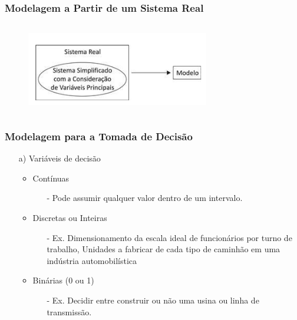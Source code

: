 \documentclass{beamer}
\begin{document}
\begin{frame}
	\frametitle{Modelagem a Partir de um Sistema Real}
	\centering
	\begin{figure}
		\includegraphics[width=8cm,height=4cm]{Figura_1_3.png}
	\end{figure}
\end{frame}

\begin{frame}
	\frametitle{Modelagem para a Tomada de Decisão}
	\begin{itemize}
	\item[a)] {Variáveis de decisão}
		\begin{itemize}
		\item {Contínuas}
			\begin{itemize}
			\item[-] Pode assumir qualquer valor dentro de um intervalo.  
			\end{itemize}
		\item {Discretas ou Inteiras}
			\begin{itemize}
			\item[-] Ex. Dimensionamento da escala ideal de funcionários por turno de trabalho, Unidades a fabricar de cada tipo de caminhão em uma indústria automobilística 
			\end{itemize}
		\item {Binárias (0 ou 1)}
			\begin{itemize}
			\item[-] Ex. Decidir entre construir ou não uma usina ou linha de transmissão. 
			\end{itemize}		
		\end{itemize}
	\end{itemize}
\end{frame}
\end{document}
